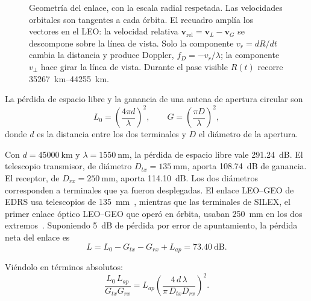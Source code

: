 \begin{figure}[H]
\caption[Geometr\'ia del enlace LEO--GEO]{%
Geometr\'ia del enlace, con la escala radial respetada. Las velocidades
orbitales son tangentes a cada \'orbita. El recuadro ampl\'ia los vectores en
el LEO: la velocidad relativa $\mathbf{v}_\mathrm{rel}=\mathbf{v}_L-\mathbf{v}_G$
se descompone sobre la l\'inea de vista. Solo la componente $v_r=dR/dt$ cambia
la distancia y produce Doppler, $f_D=-v_r/\lambda$; la componente $v_\perp$
hace girar la l\'inea de vista. Durante el pase visible $R(t)$ recorre
\SIrange{35267}{44255}{\kilo\metre}.}
\label{fig:geometria}
\end{figure}
La p\'erdida de espacio libre y la ganancia de una antena de apertura circular son
\begin{equation}
  L_{0} = \left(\frac{4\pi d}{\lambda}\right)^{2},
  \qquad
  G = \left(\frac{\pi D}{\lambda}\right)^{2},
  \label{eq:fspl}
\end{equation}
donde $d$ es la distancia entre los dos terminales y $D$ el di\'ametro de la
apertura.

Con $d=\SI{45000}{\kilo\metre}$ y $\lambda=\SI{1550}{\nano\metre}$, la
p\'erdida de espacio libre vale \SI{291.24}{\dB}. El telescopio transmisor, de
di\'ametro $D_{tx}=\SI{135}{\milli\metre}$, aporta \SI{108.74}{\dB} de
ganancia. El receptor, de $D_{rx}=\SI{250}{\milli\metre}$, aporta
\SI{114.10}{\dB}. Los dos di\'ametros corresponden a terminales que ya
fueron desplegadas. El enlace LEO--GEO de EDRS usa telescopios de
\SI{135}{\milli\metre}~\cite{gutlich2014}, mientras que las terminales de SILEX, el primer
enlace \'optico LEO--GEO que oper\'o en \'orbita, usaban
\SI{250}{\milli\metre} en los dos extremos~\cite{carrascocasado2020,
esa_silex2001}. Suponiendo \SI{5}{\dB} de p\'erdida por error de apuntamiento,
la p\'erdida neta del enlace es
\begin{equation}
  L = L_{0} - G_{tx} - G_{rx} + L_{ap} = \SI{73.40}{\dB}.
  \label{eq:pathloss}
\end{equation}

Vi\'endolo en t\'erminos absolutos:
\begin{equation}
  \frac{L_{0}\,L_{ap}}{G_{tx}G_{rx}}
    = L_{ap}\left(\frac{4\,d\,\lambda}{\pi\,D_{tx}D_{rx}}\right)^{2}.
  \label{eq:pathloss-cerrada}
\end{equation}

